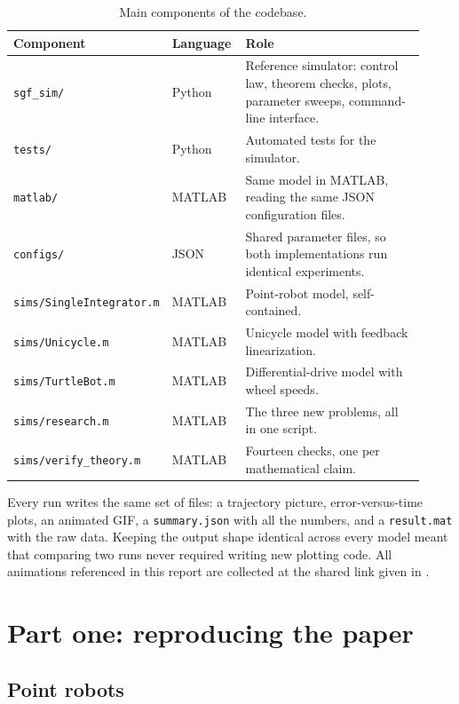 \documentclass[11pt,a4paper]{article}
\begin{document}
\begin{table}[H]
\centering
\caption{Main components of the codebase.}
\label{tab:code}
\small
\begin{tabular}{@{}p{0.26\linewidth}p{0.18\linewidth}p{0.48\linewidth}@{}}
\toprule
Component & Language & Role \\
\midrule
\texttt{sgf\_sim/} & Python & Reference simulator: control law, theorem checks, plots, parameter
sweeps, command-line interface. \\
\texttt{tests/} & Python & Automated tests for the simulator. \\
\texttt{matlab/} & MATLAB & Same model in MATLAB, reading the same JSON configuration files. \\
\texttt{configs/} & JSON & Shared parameter files, so both implementations run identical
experiments. \\
\texttt{sims/SingleIntegrator.m} & MATLAB & Point-robot model, self-contained. \\
\texttt{sims/Unicycle.m} & MATLAB & Unicycle model with feedback linearization. \\
\texttt{sims/TurtleBot.m} & MATLAB & Differential-drive model with wheel speeds. \\
\texttt{sims/research.m} & MATLAB & The three new problems, all in one script. \\
\texttt{sims/verify\_theory.m} & MATLAB & Fourteen checks, one per mathematical claim. \\
\bottomrule
\end{tabular}
\end{table}

Every run writes the same set of files: a trajectory picture, error-versus-time plots, an animated
GIF, a \texttt{summary.json} with all the numbers, and a \texttt{result.mat} with the raw data. Keeping
the output shape identical across every model meant that comparing two runs never required writing
new plotting code. All animations referenced in this report are collected at the shared link given
in \cite{animations}.

\section{Part one: reproducing the paper}

\subsection{Point robots}
\end{document}
